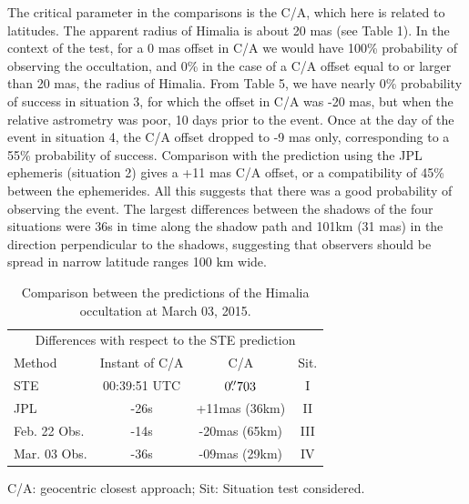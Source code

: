 
The critical parameter in the comparisons is the C/A, which here is related to latitudes. The apparent radius of Himalia is about 20 mas (see Table 1). In the context of the test, for a 0 mas offset in C/A we would have 100\% probability of observing the occultation, and 0\% in the case of a C/A offset equal to or larger than 20 mas, the radius of Himalia. From Table 5, we have nearly 0\% probability of success in situation 3, for which the offset in C/A was -20 mas, but when the relative astrometry was poor, 10 days prior to the event. Once at the day of the event in situation 4, the C/A offset dropped to -9 mas only, corresponding to a 55\% probability of success. Comparison with the prediction using the JPL ephemeris (situation 2) gives a +11 mas C/A offset, or a compatibility of 45\% between the ephemerides. All this suggests that there was a good probability of observing the event. The largest differences between the shadows of the four situations were 36s in time along the shadow path and 101km (31 mas) in the direction perpendicular to the shadows, suggesting that observers should be spread in narrow latitude ranges 100 km wide.

\begin{table}
\caption{\label{Tab: comparison-Himalia} Comparison between the predictions of the Himalia occultation at March 03, 2015.}
\begin{centering}
\begin{tabular}{lccc}
\hline  \hline
\multicolumn{4}{c}{Differences with respect to the STE prediction} \tabularnewline
Method  & Instant of C/A  & C/A & Sit.   \tabularnewline
\hline
STE & 00:39:51 UTC & $0\hbox{$.\!\!^{\prime\prime}$}703$ & I \tabularnewline
JPL & -26s & +11mas (36km) & II \tabularnewline %
Feb. 22 Obs. & -14s & -20mas (65km) & III \tabularnewline %
Mar. 03 Obs. & -36s & -09mas (29km) & IV \tabularnewline %
\hline
\end{tabular}
\par\end{centering}
C/A: geocentric closest approach; Sit: Situation test considered.
\end{table}

